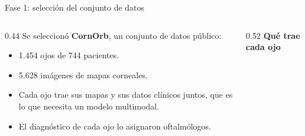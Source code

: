 

\begin{frame}{Fase 1: selección del conjunto de datos}
    \begin{columns}[T]
        \begin{column}{0.44\textwidth}
            Se seleccionó \textbf{CornOrb}, un conjunto de datos público:
            \begin{itemize}
                \item 1.454 ojos de 744 pacientes.
                \item 5.628 imágenes de mapas corneales.
                \item Cada ojo trae sus mapas y sus datos clínicos juntos, que es lo que necesita un modelo multimodal.
                \item El diagnóstico de cada ojo lo asignaron oftalmólogos.
            \end{itemize}
        \end{column}
        \begin{column}{0.52\textwidth}
            \centering
            {\small\textbf{Qué trae cada ojo}}\par\vspace{0.2cm}
        \end{column}
    \end{columns}
\end{frame}

